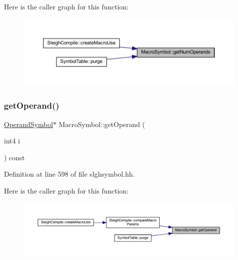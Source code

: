 Here is the caller graph for this function\+:
\nopagebreak
\begin{figure}[H]
\begin{center}
\leavevmode
\includegraphics[width=350pt]{class_macro_symbol_a0b0cefad99fd10752c4c18acad7e2310_icgraph}
\end{center}
\end{figure}
\mbox{\label{class_macro_symbol_a82ff6faaa968d2c28269370a886420cc}} 
\subsubsection{\texorpdfstring{getOperand()}{getOperand()}}
{\footnotesize\ttfamily \mbox{\hyperlink{class_operand_symbol}{Operand\+Symbol}}$\ast$ Macro\+Symbol\+::get\+Operand (\begin{DoxyParamCaption}\item[{int4}]{i }\end{DoxyParamCaption}) const\hspace{0.3cm}{\ttfamily [inline]}}



Definition at line 598 of file slghsymbol.\+hh.

Here is the caller graph for this function\+:
\nopagebreak
\begin{figure}[H]
\begin{center}
\leavevmode
\includegraphics[width=350pt]{class_macro_symbol_a82ff6faaa968d2c28269370a886420cc_icgraph}
\end{center}
\end{figure}
\mbox{\label{class_macro_symbol_af91e4932c105c106681633304083ffc4}} 
